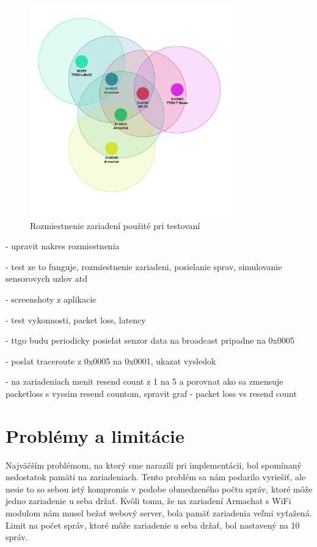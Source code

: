 \documentclass[slovak,master]{diploma}
\begin{document}
\begin{figure}[h]
  \centering
  \includegraphics[width=0.8\textwidth]{Figures/topology.png}
  \caption{Rozmiestnenie zariadení použité pri testovaní}
  \label{fig:topology}
\end{figure}

- upravit nakres rozmiestnenia

- test ze to funguje, rozmiestnenie zariadeni, posielanie sprav, simulovanie sensorovych uzlov atd

- screenshoty z aplikacie

- test vykonnosti, packet loss, latency

- ttgo budu periodicky posielat senzor data na broadcast pripadne na 0x0005

- poslat traceroute z 0x0005 na 0x0001, ukazat vysledok

- na zariadeniach menit resend count z 1 na 5 a porovnat ako sa zmensuje packetloss s vyssim resend countom, spravit graf - packet loss vs resend count

\section{Problémy a limitácie}
Najväčším problémom, na ktorý sme narazili pri implementácii, bol spomínaný nedostatok pamäti na zariadeniach. Tento problém sa nám podarilo 
vyriešiť, ale nesie to so sebou istý kompromis v podobe obmedzeného počtu správ, ktoré môže jedno zariadenie u seba držať. Kvôli tomu, že na 
zariadení Armachat s WiFi modulom nám musel bežať webový server, bola pamäť zariadenia veľmi vyťažená. Limit na počet správ, ktoré môže zariadenie u seba držať, bol nastavený 
na 10 správ. 
\end{document}
